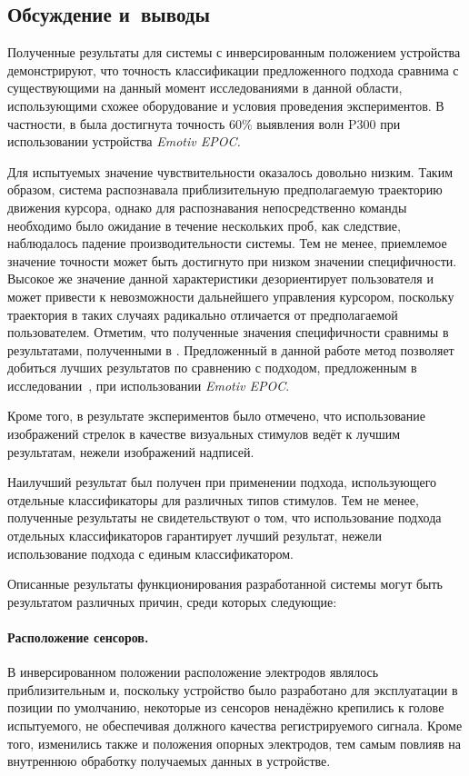 \documentclass[12pt,a4paper,oneside,fleqn,leqno]{article}
\begin{document}
\subsection{Обсуждение и~выводы}
	\par Полученные результаты для системы с инверсированным положением устройства демонстрируют, что точность классификации предложенного подхода сравнима с существующими на данный момент исследованиями в данной области, использующими схожее оборудование и условия проведения экспериментов. В частности, в \cite{rhyme} была достигнута точность 60\% выявления волн P300 при использовании устройства {\it Emotiv EPOC.}
	\par Для испытуемых значение чувствительности оказалось довольно низким. Таким образом, система распознавала приблизительную предполагаемую траекторию движения курсора, однако для распознавания непосредственно команды необходимо было ожидание в течение нескольких проб, как следствие, наблюдалось падение производительности системы. Тем не менее, приемлемое значение точности может быть достигнуто при низком значении специфичности. Высокое же значение данной характеристики дезориентирует пользователя и может привести к невозможности дальнейшего управления курсором, поскольку траектория в таких случаях радикально отличается от предполагаемой пользователем. Отметим, что полученные значения специфичности сравнимы в результатами, полученными в \cite{Kanoh}. Предложенный в данной работе метод позволяет добиться лучших результатов по сравнению с подходом, предложенным в исследовании~\cite{pseudo}, при использовании {\it Emotiv EPOC}.
	\par Кроме того, в результате экспериментов было отмечено, что использование изображений стрелок в качестве визуальных стимулов ведёт к лучшим результатам, нежели изображений надписей.
	\par Наилучший результат был получен при применении подхода, использующего отдельные классификаторы для различных типов стимулов. Тем не менее, полученные результаты не свидетельствуют о том, что использование подхода отдельных классификаторов гарантирует лучший результат, нежели использование подхода с единым классификатором.
	\par Описанные результаты функционирования разработанной системы могут быть результатом различных причин, среди которых следующие:
	\paragraph{Расположение сенсоров.}
	\par В инверсированном положении расположение электродов являлось приблизительным и, поскольку устройство было разработано для эксплуатации в позиции по умолчанию, некоторые из сенсоров ненадёжно крепились к голове испытуемого, не обеспечивая должного качества регистрируемого сигнала. Кроме того, изменились также и положения опорных электродов, тем самым повлияв на внутреннюю обработку получаемых данных в устройстве.
\end{document}
